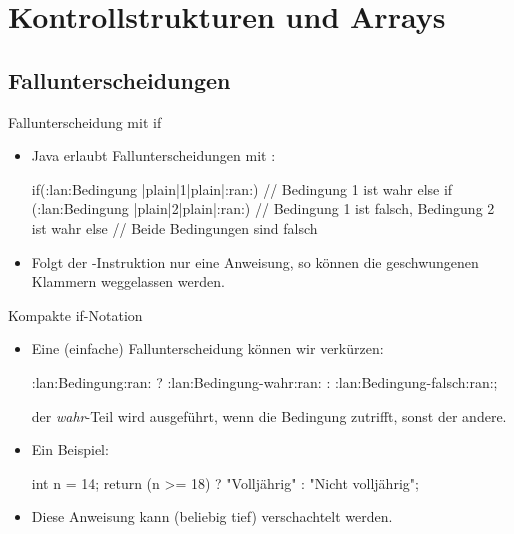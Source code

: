 \section{Kontrollstrukturen und Arrays}
\subsection{Fallunterscheidungen}

\begin{frame}[fragile]{Fallunterscheidung mit if}
    \begin{itemize}[<+(1)->]
        \item Java erlaubt Fallunterscheidungen mit :\pause{}
\begin{plainjava}
if(:lan:Bedingung |plain|1|plain|:ran:){
    // Bedingung 1 ist wahr
} else if (:lan:Bedingung |plain|2|plain|:ran:) {
    // Bedingung 1 ist falsch, Bedingung 2 ist wahr
} else {
    // Beide Bedingungen sind falsch
}
\end{plainjava}
    \item Folgt der -Instruktion nur eine Anweisung,\pause{} so können die geschwungenen Klammern weggelassen werden.
    \end{itemize}
\end{frame}


\begin{frame}[fragile]{Kompakte if-Notation}
    \begin{itemize}[<+(1)->]
        \item Eine (einfache) Fallunterscheidung können wir verkürzen:\pause{}
\begin{plainjava}
:lan:Bedingung:ran: ? :lan:Bedingung-wahr:ran: : :lan:Bedingung-falsch:ran:;
\end{plainjava}
        \pause{}der \emph{wahr}-Teil wird ausgeführt, wenn die Bedingung zutrifft,\pause{} sonst der andere.
        \item Ein Beispiel:\pause{}
\begin{plainjava}
int n = 14;
return (n >= 18) ? "Volljährig" : "Nicht volljährig";
\end{plainjava}
        \item Diese Anweisung kann (beliebig tief) verschachtelt werden.
    \end{itemize}
\end{frame}


